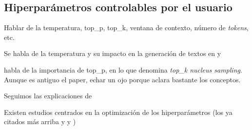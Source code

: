 \subsection{Hiperparámetros controlables por el usuario}
\label{sec:hiperparametros_controlables}
Hablar de la temperatura, top\_p, top\_k, ventana de contexto, número de \textit{tokens}, etc. 

Se habla de la temperatura y su impacto en la generación de textos en \cite{holtzmanCuriousCaseNeural2020} y \cite{chamandFinetuneYourClassifier2022}

\cite{holtzmanCuriousCaseNeural2020} habla de la importancia de top\_p, en lo que denomina \textit{top\_k nucleus sampling}. Aunque es antiguo el paper, echar un ojo porque aclara bastante los conceptos.

Seguimos las explicaciones de \cite{rothmanTransformersNaturalLanguage2021}

Existen estudios centrados en la optimización de los hiperparámetros (los ya citados más arriba y \cite{wangCostEffectiveHyperparameterOptimization2023} y \cite{wangHyperparameterOptimizationAlgorithm2022})

